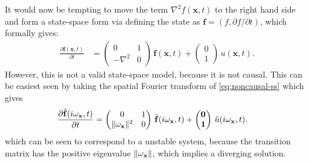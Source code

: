 \documentclass[journal]{IEEEtran}
\begin{document}
It would now be tempting to move the term $\nabla^2 f(\mathbf{x},t)$ to the right hand side and form a state-space form via defining the state as $\mathbf{f} = (f,\partial f/\partial t)$, which formally gives:
%
% 
%
\begin{equation}
\begin{split}
  \frac{\partial \mathbf{f}(\mathbf{x},t)}{\partial t} &= 
       \begin{pmatrix} 
        0 & 1 \\ 
        -\nabla^2 & 0
      \end{pmatrix} \, \mathbf{f}(\mathbf{x},t)
      + \begin{pmatrix} 0 \\ 1 \end{pmatrix} \, u(\mathbf{x},t).
\end{split}
\label{eq:noncausal-ss}
\end{equation}
%
However, this is not a valid state-space model, because it is not causal. This can be easiest seen by taking the spatial Fourier transform of \eqref{eq:noncausal-ss} which gives
%
\begin{equation}
\begin{split}
  \frac{\partial \tilde{\mathbf{f}}(i \boldmath{\omega}_\mathbf{x},t)}{\partial t} &= 
       \begin{pmatrix} 
        0 & 1 \\ 
        \| \boldmath{\omega}_{\mathbf{x}} \|^2 & 0
      \end{pmatrix} \, \tilde{\mathbf{f}}(i \boldmath{\omega}_\mathbf{x},t)
      + \begin{pmatrix} 0 \\ 1 \end{pmatrix} \, \tilde{u}(i \boldmath{\omega}_\mathbf{x},t).
\end{split}
\end{equation}
%
which can be seen to correspond to a unstable system, because the transition matrix has the positive eigenvalue $\| \boldmath{\omega}_{\mathbf{x}} \|$, which implies a diverging solution.
\end{document}
